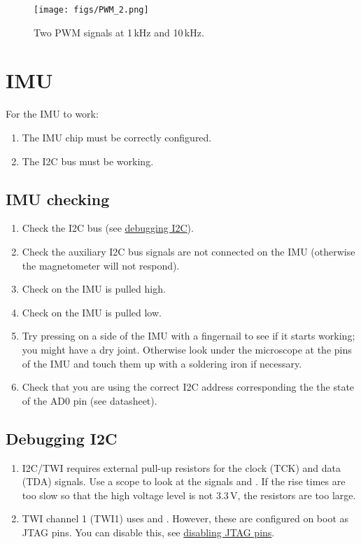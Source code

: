 \begin{figure}[!h]
\centering
\texttt{[image: figs/PWM\_2.png]}
\caption{Two PWM signals at 1\,kHz and 10\,kHz.}
\end{figure}


\section{IMU}
\label{imu}

For the IMU to work:
%
\begin{enumerate}
\item The IMU chip must be correctly configured.
\item The I2C bus must be working.
\end{enumerate}


\subsection{IMU checking}
\label{checking-IMU}

\begin{enumerate}
\item Check the I2C bus (see \hyperref[debugging-i2c]{debugging I2C}).
\item Check the auxiliary I2C bus signals are not connected on the IMU
  (otherwise the magnetometer will not respond).
\item Check  on the IMU is pulled high.
\item Check  on the IMU is pulled low.
\item Try pressing on a side of the IMU with a fingernail to see if it
  starts working; you might have a dry joint.  Otherwise look under
  the microscope at the pins of the IMU and touch them up with a
  soldering iron if necessary.
\item Check that you are using the correct I2C address corresponding
the the state of the AD0 pin (see datasheet).
\end{enumerate}


\subsection{Debugging I2C}
\label{debugging-i2c}

\begin{enumerate}
\item
  I2C/TWI requires external pull-up resistors for the clock (TCK) and
  data (TDA) signals.  Use a scope to look at the signals
   and .  If the rise times are too slow so
  that the high voltage level is not 3.3\,V, the resistors are too
  large.
\item
  TWI channel 1 (TWI1) uses  and . However, these
  are configured on boot as JTAG pins. You can disable this, see
  \hyperref[disabling-jtag-pins]{disabling JTAG pins}.
\end{enumerate}

